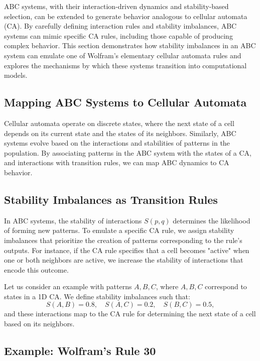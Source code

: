 \documentclass[entropy,article,submit,pdftex,moreauthors]{Definitions/mdpi}
\begin{document}
ABC systems, with their interaction-driven dynamics and stability-based selection, can be extended to generate behavior analogous to cellular automata (CA). By carefully defining interaction rules and stability imbalances, ABC systems can mimic specific CA rules, including those capable of producing complex behavior. This section demonstrates how stability imbalances in an ABC system can emulate one of Wolfram’s elementary cellular automata rules and explores the mechanisms by which these systems transition into computational models.

\subsection{Mapping ABC Systems to Cellular Automata}

Cellular automata operate on discrete states, where the next state of a cell depends on its current state and the states of its neighbors. Similarly, ABC systems evolve based on the interactions and stabilities of patterns in the population. By associating patterns in the ABC system with the states of a CA, and interactions with transition rules, we can map ABC dynamics to CA behavior.

\subsection{Stability Imbalances as Transition Rules}

In ABC systems, the stability of interactions \( S(p, q) \) determines the likelihood of forming new patterns. To emulate a specific CA rule, we assign stability imbalances that prioritize the creation of patterns corresponding to the rule’s outputs. For instance, if the CA rule specifies that a cell becomes "active" when one or both neighbors are active, we increase the stability of interactions that encode this outcome.

Let us consider an example with patterns \( A, B, C \), where \( A, B, C \) correspond to states in a 1D CA. We define stability imbalances such that:
\[
S(A, B) = 0.8, \quad S(A, C) = 0.2, \quad S(B, C) = 0.5,
\]
and these interactions map to the CA rule for determining the next state of a cell based on its neighbors.

\subsection{Example: Wolfram’s Rule 30}
\end{document}

